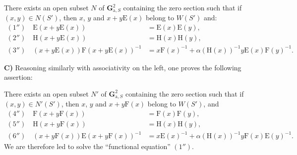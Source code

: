 There exists an open subset $N$ of $\mathbf G_{\mathrm a,S}^2$ containing the zero section such that if $(x,y)\in N(S')$, then $x$, $y$ and $x+y\mathrm E(x)${\renewcommand{\thefootnote}{(15)}} belong to $W(S')$ and:
\[
\begin{aligned}
(1'')\quad\mathrm E(x+y\mathrm E(x))&=\mathrm E(x)\mathrm E(y),\\
(2'')\quad\mathrm H(x+y\mathrm E(x))&=\mathrm H(x)\mathrm H(y),\\
(3'')\quad(x+y\mathrm E(x))\mathrm F(x+y\mathrm E(x))^{-1}&=x\mathrm F(x)^{-1}+\alpha(\mathrm H(x))^{-1}y\mathrm E(x)\mathrm F(y)^{-1}.
\end{aligned}
\]

\textbf{C)} Reasoning similarly with associativity on the left, one proves the following assertion:{\renewcommand{\thefootnote}{(16)}}

There exists an open subset $N'$ of $\mathbf G_{\mathrm a,S}^2$ containing the zero section such that if $(x,y)\in N'(S')$, then $x$, $y$ and $x+y\mathrm F(x)${\renewcommand{\thefootnote}{(17)}} belong to $W(S')$, and
\[
\begin{aligned}
(4'')\quad\mathrm F(x+y\mathrm F(x))&=\mathrm F(x)\mathrm F(y),\\
(5'')\quad\mathrm H(x+y\mathrm F(x))&=\mathrm H(x)\mathrm H(y),\\
(6'')\quad(x+y\mathrm F(x))\mathrm E(x+y\mathrm F(x))^{-1}&=x\mathrm E(x)^{-1}+\alpha(\mathrm H(x))^{-1}y\mathrm F(x)\mathrm E(y)^{-1}.
\end{aligned}
\]
We are therefore led to solve the ``functional equation'' $(1'')$.

